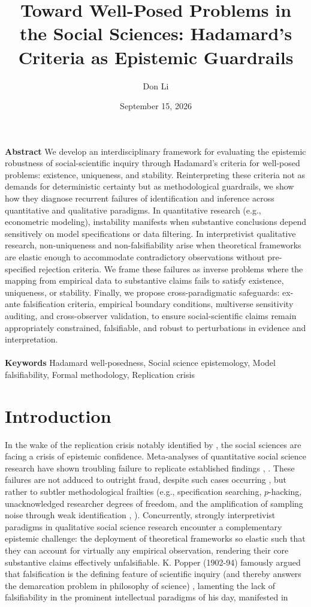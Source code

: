 \documentclass{article}
\title{Toward Well-Posed Problems in the Social Sciences: Hadamard's Criteria as Epistemic Guardrails}
\author{Don Li}
\affil{Department of Mathematics \& Statistics \\ Portland State University}
\date{September 15, 2026}
\theoremstyle{definition}
\begin{document}
\maketitle

\noindent
\textbf{Abstract} We develop an interdisciplinary framework for evaluating the epistemic robustness of social-scientific inquiry through Hadamard's criteria for well-posed problems: existence, uniqueness, and stability. Reinterpreting these criteria not as demands for deterministic certainty but as methodological guardrails, we show how they diagnose recurrent failures of identification and inference across quantitative and qualitative paradigms. In quantitative research (e.g., econometric modeling), instability manifests when substantive conclusions depend sensitively on model specifications or data filtering. In interpretivist qualitative research, non-uniqueness and non-falsifiability arise when theoretical frameworks are elastic enough to accommodate contradictory observations without pre-specified rejection criteria. We frame these failures as inverse problems where the mapping from empirical data to substantive claims fails to satisfy existence, uniqueness, or stability. Finally, we propose cross-paradigmatic safeguards: ex-ante falsification criteria, empirical boundary conditions, multiverse sensitivity auditing, and cross-observer validation, to ensure social-scientific claims remain appropriately constrained, falsifiable, and robust to perturbations in evidence and interpretation. \\
\\
\textbf{Keywords} Hadamard well-posedness, Social science epistemology, Model falsifiability, Formal methodology, Replication crisis

\section{Introduction}

In the wake of the replication crisis notably identified by \cite{Ioa05}, the social sciences are facing a crisis of epistemic confidence. Meta-analyses of quantitative social science research have shown troubling failure to replicate established findings \cite{Mis+26}, \cite{Cam+18}. These failures are not adduced to outright fraud, despite such cases occurring \cite{Baz25}, but rather to subtler methodological frailties (e.g., specification searching, $p$-hacking, unacknowledged researcher degrees of freedom, and the amplification of sampling noise through weak identification \cite{SNS11}, \cite{GL14}). Concurrently, strongly interpretivist paradigms in qualitative social science research encounter a complementary epistemic challenge: the deployment of theoretical frameworks so elastic such that they can account for virtually any empirical observation, rendering their core substantive claims effectively unfalsifiable. K. Popper (1902-94) famously argued that falsification is the defining feature of scientific inquiry (and thereby answers the demarcation problem in philosophy of science) \cite{Pop59}, lamenting the lack of falsifiability in the prominent intellectual paradigms of his day, manifested in
\end{document}
